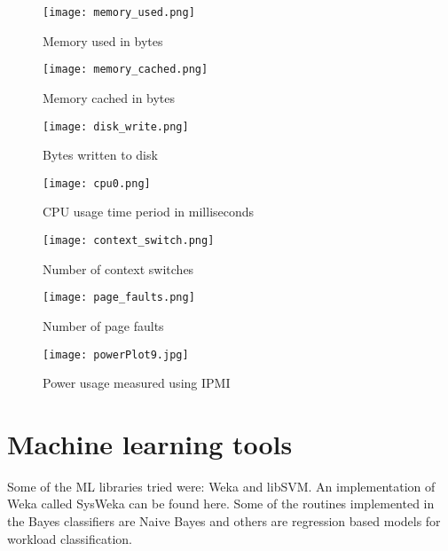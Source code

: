 \documentclass[singlecolumn,letterpaper,12pt]{article}
\begin{document}
\begin{figure}
\centering
\texttt{[image: memory\_used.png]}
\caption{Memory used in bytes}
\label{memory-used}
\end{figure}

\begin{figure}
\centering
\texttt{[image: memory\_cached.png]}
\caption{Memory cached in bytes}
\label{memory-cached}
\end{figure}

\begin{figure}
\centering
\texttt{[image: disk\_write.png]}
\caption{Bytes written to disk}
\label{disk-bytes-written}
\end{figure}

\begin{figure}
\centering
\texttt{[image: cpu0.png]}
\caption{CPU usage time period in milliseconds}
\label{cpu-time-period}
\end{figure}

\begin{figure}
\centering
\texttt{[image: context\_switch.png]}
\caption{Number of context switches}
\label{context-switches}
\end{figure}

\begin{figure}
\centering
\texttt{[image: page\_faults.png]}
\caption{Number of page faults}
\label{page-faults}
\end{figure}

\begin{figure}
\centering
\texttt{[image: powerPlot9.jpg]}
\caption{Power usage measured using IPMI}
\label{power}
\end{figure}

\section{Machine learning tools}
\label{sec:ML-tools}
Some of the ML libraries tried were: Weka and libSVM. An implementation of Weka called SysWeka can be found here. Some of the routines implemented in the Bayes classifiers are Naive Bayes and others are regression based models for workload classification.
\end{document}
